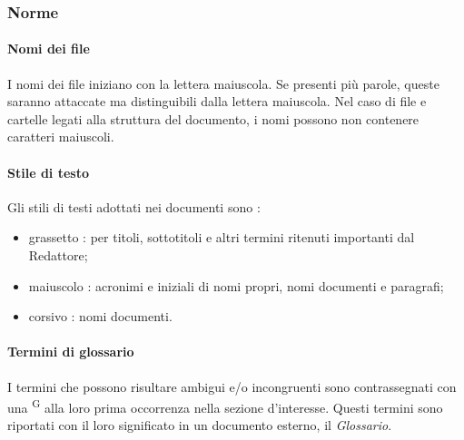 \subsubsection{Norme}
\paragraph{Nomi dei file}
I nomi dei file iniziano con la lettera maiuscola. Se presenti più parole, queste saranno attaccate ma distinguibili dalla lettera maiuscola. Nel caso di file e cartelle legati alla struttura del documento, i nomi possono non contenere caratteri maiuscoli.

\paragraph{Stile di testo}
Gli stili di testi adottati nei documenti sono :
\begin{itemize}
\item grassetto : per titoli, sottotitoli e altri termini ritenuti importanti dal Redattore;
\item maiuscolo : acronimi e iniziali di nomi propri, nomi documenti e paragrafi;
\item corsivo : nomi documenti.
\end{itemize}


\paragraph{Termini di glossario}
I termini che possono risultare ambigui e/o incongruenti sono contrassegnati con una \textsuperscript{G} alla loro prima occorrenza nella sezione d’interesse. Questi termini sono riportati con il loro significato in un documento esterno, il \textit{Glossario}.

